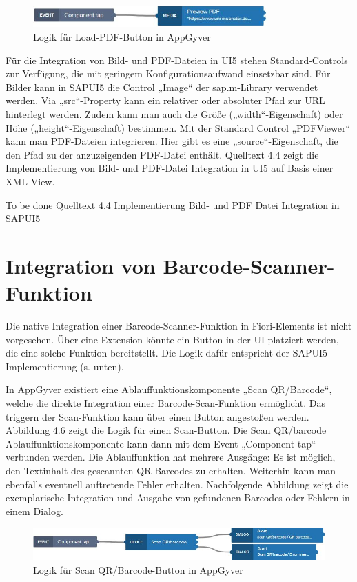 \begin{figure}[htbp]
 \centering
 \includegraphics[width=0.8\textwidth]{Bilder/appgyver/4_7_Logik_Load-PDF-Button.jpg}
 \caption{Logik für Load-PDF-Button in AppGyver}
\end{figure}

Für die Integration von Bild- und PDF-Dateien in UI5 stehen Standard-Controls zur Verfügung, die mit geringem Konfigurationsaufwand einsetzbar sind. Für Bilder kann in SAPUI5 die Control „Image“ der sap.m-Library verwendet werden. Via „src“-Property kann ein relativer oder absoluter Pfad zur URL hinterlegt werden. Zudem kann man auch die Größe („width“-Eigenschaft) oder Höhe („height“-Eigenschaft) bestimmen. Mit der Standard Control „PDFViewer“ kann man PDF-Dateien integrieren. Hier gibt es eine „source“-Eigenschaft, die den Pfad zu der anzuzeigenden PDF-Datei enthält. Quelltext 4.4 zeigt die Implementierung von Bild- und PDF-Datei Integration in UI5 auf Basis einer XML-View.

To be done Quelltext 4.4 Implementierung Bild- und PDF Datei Integration in SAPUI5

\section{Integration von Barcode-Scanner-Funktion}

Die native Integration einer Barcode-Scanner-Funktion in Fiori-Elements ist nicht vorgesehen. Über eine Extension könnte ein Button in der UI platziert werden, die eine solche Funktion bereitstellt. Die Logik dafür entspricht der SAPUI5-Implementierung (s. unten).

In AppGyver existiert eine Ablauffunktionskomponente „Scan QR/Barcode“, welche die direkte Integration einer Barcode-Scan-Funktion ermöglicht. Das triggern der Scan-Funktion kann über einen Button angestoßen werden. Abbildung 4.6 zeigt die Logik für einen Scan-Button. Die Scan QR/barcode Ablauffunktionskomponente kann dann mit dem Event „Component tap“ verbunden werden. Die Ablauffunktion hat mehrere Ausgänge: Es ist möglich, den Textinhalt des gescannten QR-Barcodes zu erhalten. Weiterhin kann man ebenfalls eventuell auftretende Fehler erhalten. Nachfolgende Abbildung zeigt die exemplarische Integration und Ausgabe von gefundenen Barcodes oder Fehlern in einem Dialog.

\begin{figure}[htbp]
 \centering
 \includegraphics[width=1.0\textwidth]{Bilder/appgyver/4_8_logik_scan_barcode.jpg}
 \caption{Logik für Scan QR/Barcode-Button in AppGyver}
\end{figure}

